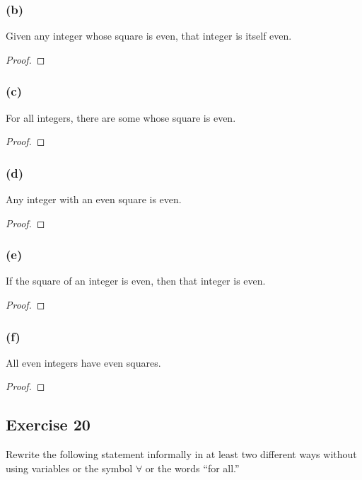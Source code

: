\documentclass[14pt]{extarticle}
\newcommand{\fa}{\forall}
\begin{document}
\subsubsection{(b)}
Given any integer whose square is even, that integer is itself even.

\begin{proof}

\end{proof}

\subsubsection{(c)}
For all integers, there are some whose square is even.

\begin{proof}

\end{proof}

\subsubsection{(d)}
Any integer with an even square is even.

\begin{proof}

\end{proof}

\subsubsection{(e)}
If the square of an integer is even, then that integer is even.

\begin{proof}

\end{proof}

\subsubsection{(f)}
All even integers have even squares.

\begin{proof}

\end{proof}

\subsection{Exercise 20}
Rewrite the following statement informally in at least two different ways without using variables or the symbol $\fa$ or the words “for all.”
\end{document}
